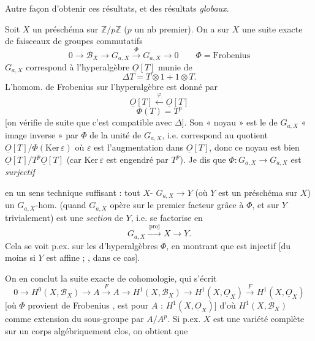 \documentclass[11pt,a4paper]{article}
\begin{document}

Autre façon d'obtenir ces résultats, et des résultats \emph{globaux}.

Soit $X$ un  préschéma
sur $\mathbb{Z}/p\mathbb{Z}$ ($p$ un nb premier). On a sur $X$ une suite
exacte de faisceaux de groupes commutatifs
\[
0 \longrightarrow \mathcal{B}_X \longrightarrow G_{a,X}
\xrightarrow{\ \Phi\ } G_{a,X} \longrightarrow 0
\qquad \Phi = \text{Frobenius}
\]
$G_{a,X}$ correspond à l'hyperalgèbre $\underline{O}[T]$ munie de
\[
\Delta T = T \otimes 1 + 1 \otimes T .
\]
L'homom. de Frobenius sur  l'hyperalgèbre est donné par
\[
\underline{O}[T] \xleftarrow{\ \varphi\ } \underline{O}[T]
\]
\struck{\ill{}}
\[
\Phi(T) = T^p
\]
[on vérifie de suite que c'est compatible avec $\Delta$]. Son « noyau » est
le  de $G_{a,X}$ « image inverse » par $\Phi$ de la
 unité de $G_{a,X}$, \struck{\ill{}} i.e. correspond au
quotient $\underline{O}[T]/\Phi(\mathrm{Ker}\,\varepsilon)$ où
$\varepsilon$ est l'augmentation dans $\underline{O}[T]$, donc ce noyau est
bien $\underline{O}[T]/T^p\underline{O}[T]$ (car $\mathrm{Ker}\,\varepsilon$
est engendré par $T^p$). Je dis
\ill{} que  $\Phi \colon G_{a,X} \to G_{a,X}$ est
\emph{surjectif}


en un sens technique suffisant : tout $X$-
$G_{a,X} \to Y$ (où $Y$ est un préschéma sur $X$)  un
$G_{a,X}$-hom. (quand $G_{a,X}$ opère sur le premier facteur grâce à $\Phi$,
et sur $Y$ trivialement) est une \emph{section} de $Y$, i.e. se factorise
en
\[
G_{a,X} \xrightarrow{\ \mathrm{proj}\ } X \longrightarrow Y .
\]
Cela se voit p.ex. sur les  \ill{} d'hyperalgèbres $\Phi$, en montrant que
 \ill{} \ill{} est injectif [du moins si $Y$ est
affine ; \struck{\ill{} \ill{}}, \ill{} \ill{} dans ce
cas].

On en conclut \ill{} la \struck{\ill{}} suite exacte de
cohomologie, qui s'écrit
\[
0 \to H^0(X, \mathcal{B}_X) \to A \xrightarrow{\ F\ } A \longrightarrow
H^1(X, \mathcal{B}_X) \to H^1(X, \underline{O}_X) \xrightarrow{\ F\ }
H^1(X, \underline{O}_X)
\]
[où $\Phi$ provient de Frobenius \struck{\ill{}}, est \ill{} \ill{} pour
$A$ : $H^1(X, \underline{O}_X)$] d'où $H^1(X, \mathcal{B}_X)$ comme
extension \ill{} \struck{\ill{}} du sous-groupe
 par $A/A^p$. Si
p.ex. $X$ est une variété complète sur un corps algébriquement clos, on
obtient que
\end{document}
